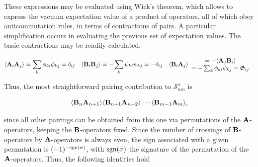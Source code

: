 \documentclass{homework}
\begin{document}
These expressions may be evaluated using Wick's theorem, which allows to express the vacuum expectation value of a product of operators, all of which obey anticommutation rules, in terms of contractions of pairs. A particular simplification occurs in evaluating the previous set of expectation values. The basic contractions may be readily calculated, 

\begin{align}
    \langle {\bf A}_i {\bf A}_j \rangle &= \sum_{k} \phi_{ki} \phi_{kj} = \delta_{ij} & \langle {\bf B}_i {\bf B}_j \rangle &= -\sum_{k} \psi_{ki} \psi_{kj} = -\delta_{ij} & \langle {\bf B}_i {\bf A}_j \rangle \begin{array}{cc}
         = -\langle {\bf A}_j {\bf B}_i \rangle  \\
         = -\sum_{k} \phi_{ki} \psi_{kj} = \mathfrak{G}_{ij}
    \end{array}.
    \label{XY_aux_var_correlators}
 \end{align}

Thus, the most straightforward pairing contribution to $\mathcal{S}_{nm}^x$ is

\begin{equation}
    \langle {\bf B}_{n} {\bf A}_{n+1} \rangle \langle {\bf B}_{n+1} {\bf A}_{n+2} \rangle \cdots \langle {\bf B}_{m-1} {\bf A}_{m} \rangle,
\end{equation}

since all other pairings can be obtained from this one via permutations of the ${\bf A}$-operators, keeping the ${\bf B}$-operators fixed. Since the number of crossings of ${\bf B}$-operators by ${\bf A}$-operators is always even, the sign associated with a given permutation is $(-1)^{-\textnormal{sgn}(\sigma)}$, with $\textnormal{sgn}(\sigma)$ the signature of the permutation of the ${\bf A}$-operators. Thus, the following identities hold
\end{document}
